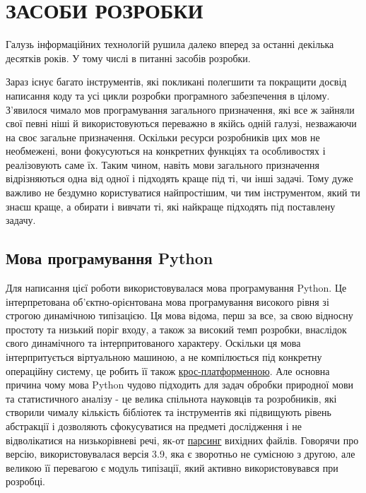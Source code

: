 \section{ЗАСОБИ РОЗРОБКИ}


Галузь інформаційних технологій рушила далеко вперед за останні декілька десятків років.
У тому числі в питанні засобів розробки. 


Зараз існує багато інструментів, які покликані
полегшити та покращити досвід написання коду та усі цикли розробки програмного забезпечення
в цілому. З'явилося чимало мов програмування загального призначення,
які все ж зайняли свої певні ніші й використовуються переважно в якійсь одній галузі,
незважаючи на своє загальне призначення. Оскільки ресурси розробників цих мов не необмежені,
вони фокусуються на конкретних функціях та особливостях і реалізовують саме їх. Таким чином,
навіть мови загального призначення відрізняються одна від одної і підходять краще під ті,
чи інші задачі. Тому дуже важливо не бездумно користуватися найпростішим, чи тим інструментом,
який ти знаєш краще, а обирати і вивчати ті, які найкраще підходять під поставлену задачу.

\subsection{Мова програмування Python}
Для написання цієї роботи використовувалася мова програмування Python. Це інтерпретована
об'єктно-орієнтована мова програмування високого рівня зі строгою динамічною типізацією.
Ця мова відома, перш за все, за свою відносну простоту та низький поріг входу,
а також за високий темп розробки, внаслідок свого динамічного та інтерпритованого характеру.
Оскільки ця мова інтерпритується віртуальною машиною, а не компілюється під конкретну
операційну систему, це робить її також \hyperlink{term1}{крос-платформенною}.
Але основна причина чому мова Python чудово підходить для задач обробки природної мови
та статистичного аналізу - це велика спільнота науковців та розробників, які створили чималу
кількість бібліотек та інструментів які підвищують рівень абстракції і дозволяють сфокусуватися
на предметі дослідження і не відволікатися на низькорівневі речі, як-от
\hyperlink{term2}{парсинг} вихідних файлів.
Говорячи про версію, використовувалася версія 3.9, яка є зворотньо не
сумісною з другою, але великою її перевагою є модуль типізації, який
активно використовувався при розробці.

